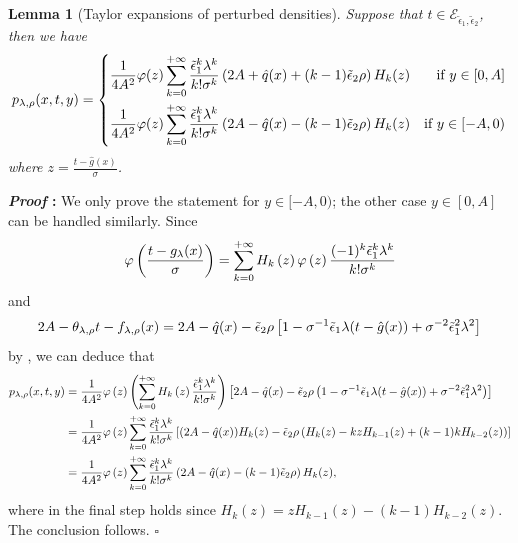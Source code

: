 \documentclass{article}
\def\eps{{\epsilon}}
\def\gE{{\mathcal{E}}}
\newtheorem{lemma}{Lemma}[section]
\renewenvironment{proof}{\noindent\textbf{\textit{Proof }:}}{\hfill$\square$}
\begin{document}
\begin{lemma}[Taylor expansions of perturbed densities]
\label{lemma:density-expansion}
    Suppose that $t\in\gE_{\tilde{\eps}_1,\tilde{\eps}_2}$, then we have
    \begin{equation}
        \notag
        p_{\lambda,\rho}(x,t,y) = \left\{
        \begin{aligned}
            & \frac{1}{4A^2} \varphi(z)\sum_{k=0}^{+\infty}\frac{\tilde{\eps}_1^k\lambda^k}{k!\sigma^k} \left(2A+\hat{q}(x)+(k-1)\tilde{\eps}_2\rho\right)H_k(z) &\text{if } y\in[0,A] \\
            & \frac{1}{4A^2}\varphi(z) \sum_{k=0}^{+\infty}\frac{\tilde{\eps}_1^k\lambda^k}{k!\sigma^k} \left(2A-\hat{q}(x)-(k-1)\tilde{\eps}_2\rho\right)H_k(z) &\text{if } y\in[-A,0)
        \end{aligned}
        \right.
    \end{equation}
    where $z = \frac{t-\hat{g}(x)}{\sigma}$.
\end{lemma}

\begin{proof}
    We only prove the statement for $y\in[-A,0)$; the other case $y\in[0,A]$ can be handled similarly.
    Since 
    \begin{equation}
        \notag
        \varphi\left(\frac{t-g_{\lambda}(x)}{\sigma}\right) = \sum_{k=0}^{+\infty} H_k\left(z\right)\varphi\left(z\right)\frac{(-1)^k\tilde{\eps}_1^k\lambda^k}{k!\sigma^k}
    \end{equation}
    and
    \begin{equation}
        \notag
        2A-\theta_{\lambda,\rho}t-f_{\lambda,\rho}(x) = 2A-\hat{q}(x)-\tilde{\eps}_2\rho\left[1-\sigma^{-1}\tilde{\eps}_1\lambda(t-\hat{g}(x)) + \sigma^{-2}\tilde{\eps}_1^2\lambda^2\right]
    \end{equation}
    by , we can deduce that
    \begin{equation}
        \notag
        \begin{aligned}
            p_{\lambda,\rho}(x,t,y) &= \frac{1}{4A^2}\varphi\left(z\right)\left(\sum_{k=0}^{+\infty} H_k\left(z\right)\frac{\tilde{\eps}_1^k\lambda^k}{k!\sigma^k}\right)\left[ 2A-\hat{q}(x)-\tilde{\eps}_2\rho\left(1-\sigma^{-1}\tilde{\eps}_1\lambda(t-\hat{g}(x)) + \sigma^{-2}\tilde{\eps}_1^2\lambda^2\right) \right] \\
            &= \frac{1}{4A^2}\varphi\left(z\right)\sum_{k=0}^{+\infty}\frac{\tilde{\eps}_1^k\lambda^k}{k!\sigma^k}\left[ (2A-\hat{q}(x))H_k(z) - \tilde{\eps}_2\rho\left(H_k(z)-kzH_{k-1}(z) + (k-1)kH_{k-2}(z)\right) \right] \\
            &= \frac{1}{4A^2}\varphi\left(z\right)\sum_{k=0}^{+\infty}\frac{\tilde{\eps}_1^k\lambda^k}{k!\sigma^k} \left(2A-\hat{q}(x)-(k-1)\tilde{\eps}_2\rho\right)H_k(z),
        \end{aligned}
    \end{equation}
    where in the final step holds since $H_k(z)=zH_{k-1}(z)-(k-1)H_{k-2}(z)$. The conclusion follows.
\end{proof}
\end{document}
